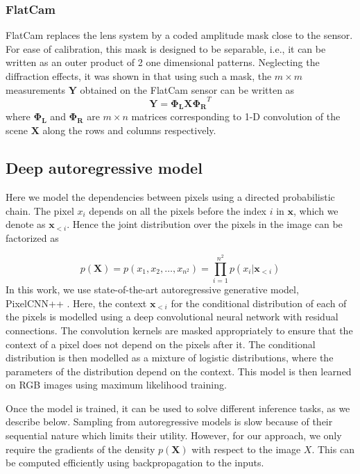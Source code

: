 \documentclass[journal,twoside]{IEEEtran}
\newcommand{\X}{\mathbf{X}}
\newcommand{\Y}{\mathbf{Y}}
\newcommand{\x}{\mathbf{x}}
\begin{document}
\subsubsection{FlatCam}
FlatCam \cite{asif2017flatcam} replaces the lens system by a coded amplitude mask close to the sensor. For ease of calibration, this mask is designed to be separable, i.e., it can be written as an outer product of 2 one dimensional patterns. Neglecting the diffraction effects, it was shown in \cite{asif2017flatcam} that using such a mask, the $m \times m$ measurements $\Y$ obtained on the FlatCam sensor can be written as 
\begin{equation}
\Y = \bm{\Phi_L} \X \bm{\Phi_R}^T
\end{equation}
where $\bm{\Phi_L}$ and $\bm{\Phi_R}$ are $m \times n$ matrices corresponding to 1-D convolution of the scene $\X$ along the rows and columns respectively. 


\subsection{Deep autoregressive model}
Here we model the dependencies between pixels using a directed probabilistic chain. The pixel $x_i$ depends on all the pixels before the index $i$ in $\x$, which we denote as $\mathbf{x}_{<i}$. Hence the joint distribution over the pixels in the image can be factorized as 

\begin{equation}
    p(\X) = p(x_1,x_2,\dots,x_{n^2}) = \prod_{i = 1}^{n^2} p(x_i|\x_{<i})
\end{equation}
In this work, we use state-of-the-art autoregressive generative model, PixelCNN++ \cite{salimans2017pixelcnn++}. Here, the context $\mathbf{x}_{<i}$ for the conditional distribution of each of the pixels is modelled using a deep convolutional neural network with residual connections. The convolution kernels are masked appropriately to ensure that the context of a pixel does not depend on the pixels after it. The conditional distribution is then modelled as a mixture of logistic distributions, where the parameters of the distribution depend on the context. This model is then learned on RGB images using maximum likelihood training.

Once the model is trained, it can be used to solve different inference tasks, as we describe below. Sampling from autoregressive models is slow because of their sequential nature which limits their utility. However, for our approach, we only require the gradients of the density $p(\X)$ with respect to the image $X$. This can be computed efficiently using backpropagation to the inputs.
\end{document}
